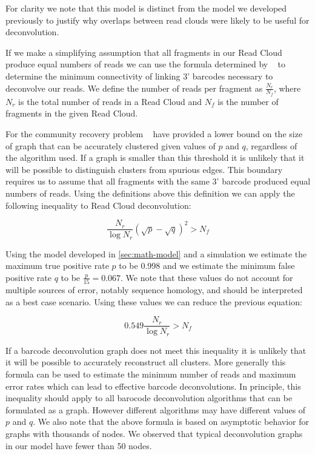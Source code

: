 For clarity we note that this model is distinct from the model we developed previously to justify why overlaps between read clouds were likely to be useful for deconvolution.

If we make a simplifying assumption that all fragments in our Read Cloud produce equal numbers of reads we can use the formula determined by ~\citep{Hajek2016} to determine the minimum connectivity of linking 3' barcodes necessary to deconvolve our reads. We define the number of reads per fragment as $\frac{N_r}{N_f}$, where $N_r$ is the total number of reads in a Read Cloud and $N_f$ is the number of fragments in the given Read Cloud.

For the community recovery problem ~\citep{Hajek2016} have provided a lower bound on the size of graph that can be accurately clustered given values of $p$ and $q$, regardless of the algorithm used. If a graph is smaller than this threshold it is unlikely that it will be possible to distinguish clusters from spurious edges. This boundary requires us to assume that all fragments with the same 3' barcode produced equal numbers of reads. Using the definitions above this definition we can apply the following inequality to Read Cloud deconvolution:

\[  \frac{N_r}{\log N_r}( \sqrt{p} - \sqrt{q})^2 > N_f \]

Using the model developed in \ref{sec:math-model} and a simulation we estimate the maximum true positive rate $p$ to be 0.998 and we estimate the minimum false positive rate $q$ to be $\frac{p}{15} = 0.067$. We note that these values do not account for multiple sources of error, notably sequence homology, and should be interpreted as a best case scenario. Using these values we can reduce the previous equation:

\[ 0.549\frac{N_r}{\log N_r} > N_f \]

If a barcode deconvolution graph does not meet this inequality it is  unlikely that it will be possible to accurately reconstruct all clusters. More generally this formula can be used to estimate the minimum number of reads and maximum error rates which can lead to effective barcode deconvolutions. In principle, this inequality should apply to all barocode deconvolution algorithms that can be formulated as a graph. However different algorithms may have different values of $p$ and $q$. We also note that the above formula is based on asymptotic behavior for graphs with thousands of nodes. We observed that typical deconvolution graphs in our model have fewer than 50 nodes. 

